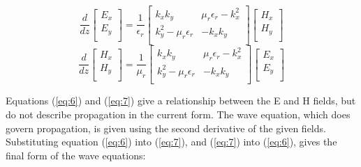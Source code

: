    \small

   \begin{equation}
   \frac{d}{dz} \left[ {\begin{array}{c}
               E_x \\
               E_y \\
               \end{array} } \right]
            = \frac{1}{\epsilon_r}
            \left[ {\begin{array}{cc}
               k_x k_y & \mu_r \epsilon_r - k_x^2 \\
               k_y^2 - \mu_r \epsilon_r & - k_x k_y \\
               \end{array} } \right]
            \left[ {\begin{array}{c}
               H_x \\
               H_y \\
               \end{array} } \right]
    \label{eq:6}
    \end{equation}
   \begin{equation}
   \frac{d}{dz} \left[ {\begin{array}{c}
               H_x \\
               H_y \\
               \end{array} } \right]
            = \frac{1}{\mu_r}
            \left[ {\begin{array}{cc}
               k_x k_y & \mu_r \epsilon_r - k_x^2 \\
               k_y^2 - \mu_r \epsilon_r & - k_x k_y \\
               \end{array} } \right]
            \left[ {\begin{array}{c}
               E_x \\
               E_y \\
               \end{array} } \right]
    \label{eq:7}
    \end{equation}

    \normalsize

     Equations (\ref{eq:6}) and (\ref{eq:7}) give a relationship between the E 
     and H fields, but do not describe propagation in the current form.  The 
     wave equation, which does govern propagation, is given using the second 
     derivative of the given fields.  Substituting equation (\ref{eq:6}) into 
     (\ref{eq:7}), and (\ref{eq:7}) into (\ref{eq:6}), gives the final form of 
     the wave equations:

